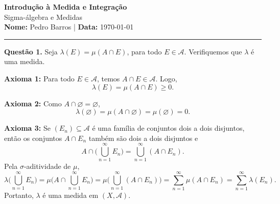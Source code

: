 \documentclass[12pt, a4paper]{article}
\newenvironment{solution}[1]{\par\vspace{1.2em}\noindent\textbf{Questão #1.}}{\par\vspace{0.5em}}
\begin{document}
\thispagestyle{empty} %
\begin{center}
    {\Large \textbf{Introdução à Medida e Integração}} \\[0.4em]
    {\large Sigma-álgebra e Medidas} \\[0.4em]
    \textbf{Nome:} Pedro Barros \quad | \quad \textbf{Data:} \today
\end{center}

\hrule
\vspace{1.5em}

\begin{solution}{1}
    Seja $\lambda(E)=\mu(A\cap E)$, para todo $E\in\mathcal{A}$. Verifiquemos que $\lambda$ é uma medida.

    \textbf{Axioma 1:} Para todo $E\in\mathcal{A}$, temos $A\cap E\in\mathcal{A}$. Logo,
    \[
        \lambda(E)=\mu(A\cap E)\geq 0.
    \]

    \textbf{Axioma 2:} Como $A\cap\varnothing=\varnothing$,
    \[
        \lambda(\varnothing)=\mu(A\cap\varnothing)=\mu(\varnothing)=0.
    \]    

    \textbf{Axioma 3:} Se $(E_n)\subseteq\mathcal{A}$ é uma família de conjuntos dois a dois disjuntos, então os conjuntos $A\cap E_n$ também são dois a dois disjuntos e
    \[
        A\cap\biggl(\bigcup_{n=1}^{\infty}E_n\biggr)
        =\bigcup_{n=1}^{\infty}(A\cap E_n).
    \]
    Pela $\sigma$-aditividade de $\mu$,
    \[
        \lambda\biggl(\bigcup_{n=1}^{\infty}E_n\biggr)
        =\mu\biggl(A\cap\bigcup_{n=1}^{\infty}E_n\biggr)
        =\mu\biggl(\bigcup_{n=1}^{\infty}(A \cap E_n)\biggr)
        =\sum_{n=1}^{\infty}\mu(A\cap E_n)
        =\sum_{n=1}^{\infty}\lambda(E_n).
    \]
    Portanto, $\lambda$ é uma medida em $(X,\mathcal{A})$.
\end{solution}
\end{document}
